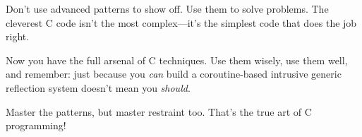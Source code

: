 Don't use advanced patterns to show off. Use them to solve problems. The cleverest C code isn't the most complex---it's the simplest code that does the job right.

Now you have the full arsenal of C techniques. Use them wisely, use them well, and remember: just because you \textit{can} build a coroutine-based intrusive generic reflection system doesn't mean you \textit{should}.

Master the patterns, but master restraint too. That's the true art of C programming!
